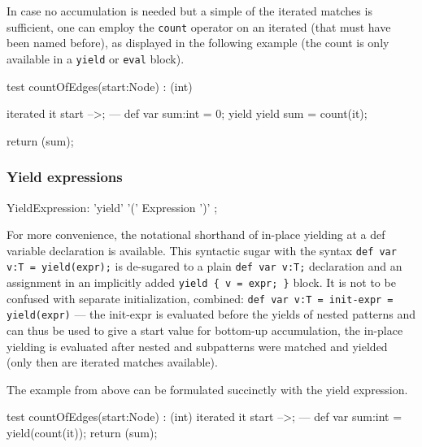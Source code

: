 In case no accumulation is needed but a simple  of the iterated matches is sufficient, one can employ the \texttt{count} operator on an iterated (that must have been named before), as displayed in the following example (the count is only available in a \texttt{yield} or \texttt{eval} block).

\begin{example}
  \begin{grgen}
test countOfEdges(start:Node) : (int)
{
	iterated it {
		start -->;
	} 
---
	def var sum:int = 0;
	yield {
		yield sum = count(it);
	}

	return (sum);
}
  \end{grgen}
\end{example}

\pagebreak

\subsubsection*{Yield expressions} 

\begin{rail} 
  YieldExpression: 'yield' '(' Expression ')' ;
\end{rail}

For more convenience, the notational shorthand of in-place yielding at a def variable declaration is available.
This syntactic sugar with the syntax \texttt{def var v:T = yield(expr);} is de-sugared to a plain \texttt{def var v:T;} declaration and an assignment in an implicitly added \verb#yield { v = expr; }# block.
It is not to be confused with separate initialization, combined: \texttt{def var v:T = init-expr = yield(expr)} --- the init-expr is evaluated before the yields of nested patterns and can thus be used to give a start value for bottom-up accumulation, the in-place yielding is evaluated after nested and subpatterns were matched and yielded (only then are iterated matches available).

The example from above can be formulated succinctly with the yield expression.

\begin{example}
  \begin{grgen}
test countOfEdges(start:Node) : (int)
{
	iterated it {
		start -->;
	} 
---
	def var sum:int = yield(count(it));
	return (sum);
}
  \end{grgen}
\end{example}


